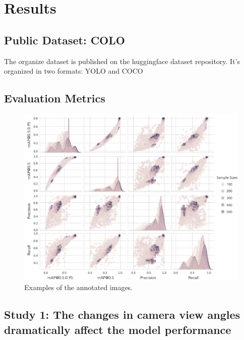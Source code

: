 \section{Results}

\subsection*{Public Dataset: COLO}

The organize dataset is published on the huggingface dataset repository. It's organized in two formats: YOLO and COCO

\subsection*{Evaluation Metrics}


\begin{figure}[h]
    \centering
    \includegraphics[width=1\textwidth]{figure_s1.jpg}
    \caption{Examples of the annotated images.}
    \label{fig:metrics}
\end{figure}



\subsection*{Study 1: The changes in camera view angles dramatically affect the model performance}



